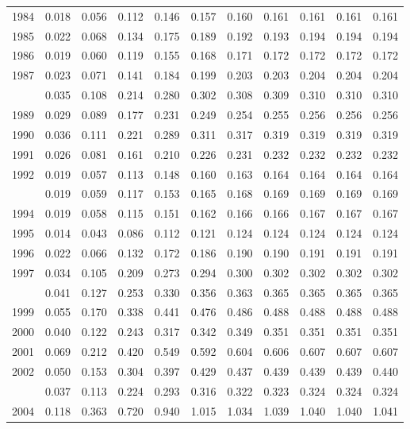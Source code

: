 \documentclass[
]{article}
\begin{document}
\begin{longtable}[t]{lrrrrrrrrrr}
1984 & 0.018 & 0.056 & 0.112 & 0.146 & 0.157 & 0.160 & 0.161 & 0.161 & 0.161 & 0.161\\
1985 & 0.022 & 0.068 & 0.134 & 0.175 & 0.189 & 0.192 & 0.193 & 0.194 & 0.194 & 0.194\\
1986 & 0.019 & 0.060 & 0.119 & 0.155 & 0.168 & 0.171 & 0.172 & 0.172 & 0.172 & 0.172\\
1987 & 0.023 & 0.071 & 0.141 & 0.184 & 0.199 & 0.203 & 0.203 & 0.204 & 0.204 & 0.204\\
\addlinespace
1988 & 0.035 & 0.108 & 0.214 & 0.280 & 0.302 & 0.308 & 0.309 & 0.310 & 0.310 & 0.310\\
1989 & 0.029 & 0.089 & 0.177 & 0.231 & 0.249 & 0.254 & 0.255 & 0.256 & 0.256 & 0.256\\
1990 & 0.036 & 0.111 & 0.221 & 0.289 & 0.311 & 0.317 & 0.319 & 0.319 & 0.319 & 0.319\\
1991 & 0.026 & 0.081 & 0.161 & 0.210 & 0.226 & 0.231 & 0.232 & 0.232 & 0.232 & 0.232\\
1992 & 0.019 & 0.057 & 0.113 & 0.148 & 0.160 & 0.163 & 0.164 & 0.164 & 0.164 & 0.164\\
\addlinespace
1993 & 0.019 & 0.059 & 0.117 & 0.153 & 0.165 & 0.168 & 0.169 & 0.169 & 0.169 & 0.169\\
1994 & 0.019 & 0.058 & 0.115 & 0.151 & 0.162 & 0.166 & 0.166 & 0.167 & 0.167 & 0.167\\
1995 & 0.014 & 0.043 & 0.086 & 0.112 & 0.121 & 0.124 & 0.124 & 0.124 & 0.124 & 0.124\\
1996 & 0.022 & 0.066 & 0.132 & 0.172 & 0.186 & 0.190 & 0.190 & 0.191 & 0.191 & 0.191\\
1997 & 0.034 & 0.105 & 0.209 & 0.273 & 0.294 & 0.300 & 0.302 & 0.302 & 0.302 & 0.302\\
\addlinespace
1998 & 0.041 & 0.127 & 0.253 & 0.330 & 0.356 & 0.363 & 0.365 & 0.365 & 0.365 & 0.365\\
1999 & 0.055 & 0.170 & 0.338 & 0.441 & 0.476 & 0.486 & 0.488 & 0.488 & 0.488 & 0.488\\
2000 & 0.040 & 0.122 & 0.243 & 0.317 & 0.342 & 0.349 & 0.351 & 0.351 & 0.351 & 0.351\\
2001 & 0.069 & 0.212 & 0.420 & 0.549 & 0.592 & 0.604 & 0.606 & 0.607 & 0.607 & 0.607\\
2002 & 0.050 & 0.153 & 0.304 & 0.397 & 0.429 & 0.437 & 0.439 & 0.439 & 0.439 & 0.440\\
\addlinespace
2003 & 0.037 & 0.113 & 0.224 & 0.293 & 0.316 & 0.322 & 0.323 & 0.324 & 0.324 & 0.324\\
2004 & 0.118 & 0.363 & 0.720 & 0.940 & 1.015 & 1.034 & 1.039 & 1.040 & 1.040 & 1.041\\

\end{longtable}
\end{document}
